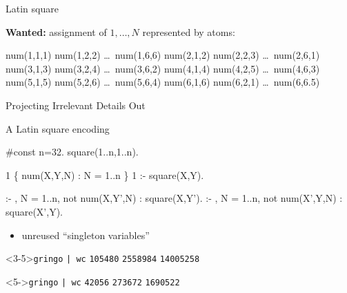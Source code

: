 \begin{frame}{Latin square}
\begin{minipage}[t]{0.52\linewidth}
\begin{block}{\textbf{Wanted:} assignment of $1,\dots,N$}
represented by atoms:
\vspace*{-2mm}\footnotesize
\begin{semiverbatim}
num(1,1,1) num(1,2,2) \dots\ num(1,6,6)
num(2,1,2) num(2,2,3) \dots\ num(2,6,1)
num(3,1,3) num(3,2,4) \dots\ num(3,6,2)
num(4,1,4) num(4,2,5) \dots\ num(4,6,3)
num(5,1,5) num(5,2,6) \dots\ num(5,6,4)
num(6,1,6) num(6,2,1) \dots\ num(6,6.5)
\end{semiverbatim}
\vspace*{-2mm}
\end{block}
\end{minipage}%
\end{frame}
\begin{frame}[fragile]{Projecting Irrelevant Details Out}
\begin{block}{A Latin square encoding}
\vspace*{-4mm}\footnotesize
\begin{semiverbatim}
#const n=32. square(1..n,1..n).

1 \{ num(X,Y,N) : N = 1..n \} 1 :- square(X,Y).

:- , N = 1..n, not num(X,Y',N) : square(X,Y').
:- , N = 1..n, not num(X',Y,N) : square(X',Y).
\end{semiverbatim}
\vspace*{-2mm}
\end{block}
\vspace*{-2mm}
\begin{itemize}
\item<2-3> \alert<2>{unreused ``singleton variables''}
\end{itemize}
\vspace*{-4mm}
\begin{minipage}[t]{0.47\linewidth}%
\begin{block}<3-5>{\lstinline{gringo}  \lstinline{| wc}}
\lstinline{105480} \alert<5>{\lstinline{2558984}} \lstinline{14005258}
\end{block}
\end{minipage}\hfill
\begin{minipage}[t]{0.47\linewidth}%
\begin{block}<5->{\lstinline{gringo}  \lstinline{| wc}}
\lstinline{42056} \alert<5>{\lstinline{273672}} \lstinline{1690522}
\end{block}
\end{minipage}
\end{frame}
